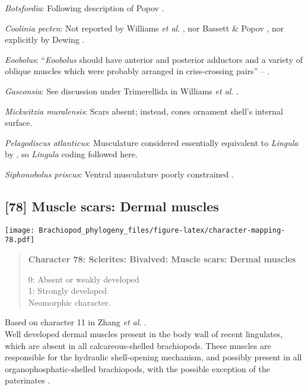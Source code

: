 \documentclass[openany]{book}
\theoremstyle{definition}
\theoremstyle{definition}
\theoremstyle{definition}
\theoremstyle{remark}
\begin{document}
\hypertarget{Botsfordia-coding-77}{}
\emph{Botsfordia}: Following description of Popov
\citeyearpar{Popov1992TheCambrian}.

\hypertarget{Coolinia_pecten-coding-77}{}
\emph{Coolinia pecten}: Not reported by Williams \emph{et al}.
\citeyearpar{Williams2000LinguliformeaCraniiformea}, nor Bassett \&
Popov \citeyearpar{Bassett2017Earliestontogeny}, nor explicitly by
Dewing \citeyearpar{Dewing2001Hingemodifications}.

\hypertarget{Eoobolus-coding-77}{}
\emph{Eoobolus}: ``\emph{Eoobolus} should have anterior and posterior
adductors and a variety of oblique muscles which were probably arranged
in criss-crossing pairs'' -- \citet{Balthasar2009Thebrachiopod}.

\hypertarget{Gasconsia-coding-77}{}
\emph{Gasconsia}: See discussion under Trimerellida in Williams \emph{et
al}. \citeyearpar{Williams2000LinguliformeaCraniiformea}.

\hypertarget{Mickwitzia_muralensis-coding-77}{}
\emph{Mickwitzia muralensis}: Scars absent; instead, cones ornament
shell's internal surface.

\hypertarget{Pelagodiscus_atlanticus-coding-77}{}
\emph{Pelagodiscus atlanticus}: Musculature considered essentially
equivalent to \emph{Lingula} by
\citet{Williams2000LinguliformeaCraniiformea}, so \emph{Lingula} coding
followed here.

\hypertarget{Siphonobolus_priscus-coding-77}{}
\emph{Siphonobolus priscus}: Ventral musculature poorly constrained
\citep{Williams2000LinguliformeaCraniiformea, Popov2009Earlyontogeny}.

\subsection*{{[}78{]} Muscle scars: Dermal
muscles}\label{muscle-scars-dermal-muscles}

\texttt{[image: Brachiopod\_phylogeny\_files/figure-latex/character-mapping-78.pdf]}

\begin{quote}
\textbf{Character 78: Sclerites: Bivalved: Muscle scars: Dermal muscles}

0: Absent or weakly developed\\
1: Strongly developed\\
Neomorphic character.
\end{quote}

Based on character 11 in Zhang \emph{et al}.
\citeyearpar{Zhang2014Anearly}.\\
Well developed dermal muscles present in the body wall of recent
lingulates, which are absent in all calcareous-shelled brachiopods.
These muscles are responsible for the hydraulic shell-opening mechanism,
and possibly present in all organophosphatic-shelled brachiopods, with
the possible exception of the paterinates
\citep[p.~32]{Williams2000LinguliformeaCraniiformea}.
\end{document}

